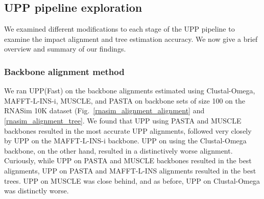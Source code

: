 \subsection{UPP pipeline exploration\label{upp_variant}}
We examined different modifications to each stage of the UPP pipeline to examine the impact alignment and tree estimation accuracy.  We now give a brief overview and summary of our findings.

\clearpage
\subsubsection{Backbone alignment method}
We ran UPP(Fast) on the backbone alignments estimated using Clustal-Omega, MAFFT-L-INS-i, MUSCLE, and PASTA on backbone sets of size 100 on the RNASim 10K dataset (Fig.~\ref{rnasim_alignment_alignment} and \ref{rnasim_alignment_tree}.  We found that UPP using PASTA and MUSCLE backbones resulted in the most accurate UPP alignments, followed very closely by UPP on the MAFFT-L-INS-i backbone.  UPP on using the Clustal-Omega backbone, on the other hand, resulted in a distinctively worse alignment.  Curiously, while UPP on PASTA and MUSCLE backbones resulted in the best alignments, UPP on PASTA and MAFFT-L-INS alignments resulted in the best trees.  UPP on MUSCLE was close behind, and as before, UPP on Clustal-Omega was distinctly worse.  





